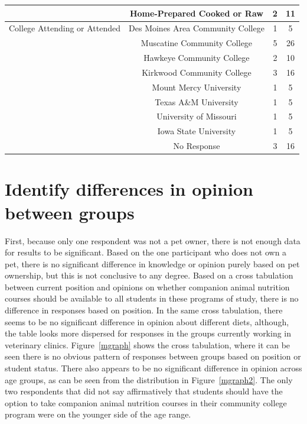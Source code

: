 \begin{table}[htbp]
\begin{tabular}{c|c|cc}
        &   Home-Prepared Cooked or Raw &   2   &   11  \\  \hline
College Attending or Attended   &   Des Moines Area Community College   &   1   &   5   \\
        &   Muscatine Community College &   5   &   26  \\
        &   Hawkeye Community College   &   2   &   10  \\
        &   Kirkwood Community College  &   3   &   16  \\
        &   Mount Mercy University  &   1   &   5   \\
        &   Texas A\&M University   &   1   &   5   \\
        &   University of Missouri  &   1   &   5   \\
        &   Iowa State University   &   1   &   5   \\
        &   No Response &   3   &   16  \\  \hline
    \end{tabular}
\end{table}

\section{Identify differences in opinion between groups}
First, because only one respondent was not a pet owner, there is not enough data for results to be significant. Based on the one participant who does not own a pet, there is no significant difference in knowledge or opinion purely based on pet ownership, but this is not conclusive to any degree. Based on a cross tabulation between current position and opinions on whether companion animal nutrition courses should be available to all students in these programs of study, there is no difference in responses based on position. In the same cross tabulation, there seems to be no significant difference in opinion about different diets, although, the table looks more dispersed for responses in the groups currently working in veterinary clinics. Figure~\ref{mgraph} shows the cross tabulation, where it can be seen there is no obvious pattern of responses between groups based on position or student status. There also appears to be no significant difference in opinion across age groups, as can be seen from the distribution in Figure~\ref{mgraph2}. The only two respondents that did not say affirmatively that students should have the option to take companion animal nutrition courses in their community college program were on the younger side of the age range.

